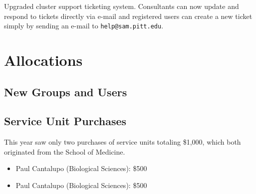 Upgraded cluster support ticketing system.  Consultants can now update and
respond to tickets directly via e-mail and registered users can create a
new ticket simply by sending an e-mail to \texttt{help@sam.pitt.edu}.


\section{Allocations}
\subsection{New Groups and Users}
\subsection{Service Unit Purchases}
This year saw only two purchases of service units totaling \$1,000, which both originated from the School of Medicine.
\begin{itemize}
    \item Paul Cantalupo (Biological Sciences): \$500
    \item Paul Cantalupo (Biological Sciences): \$500
\end{itemize}

